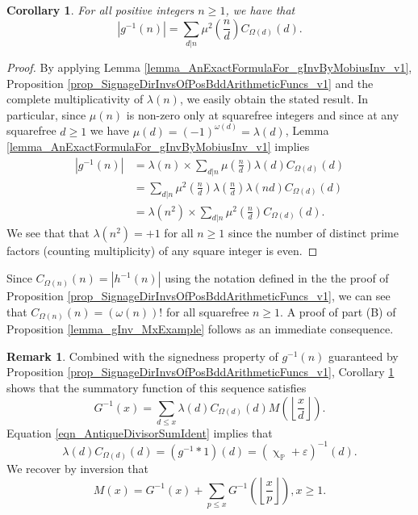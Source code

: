 \documentclass[11pt,reqno,a4letter]{article}
\numberwithin{figure}{section}
\numberwithin{table}{section}
\newcommand{\cf}{\textit{cf.\ }}
\renewcommand{\chi}{\upchi}
\newcommand{\Floor}[2]{\ensuremath{\left\lfloor \frac{#1}{#2} \right\rfloor}}
\theoremstyle{plain}
\newtheorem{cor}[theorem]{Corollary}
\numberwithin{theorem}{section}
\theoremstyle{definition}
\newtheorem{remark}[theorem]{Remark}
\begin{document}
\begin{cor} 
\label{lemma_AbsValueOf_gInvn_FornSquareFree_v1} 
For all positive integers $n \geq 1$, we have that 
\begin{equation} 
\label{eqn_AbsValueOf_gInvn_FornSquareFree_v1} 
|g^{-1}(n)| = \sum_{d|n} \mu^2\left(\frac{n}{d}\right) C_{\Omega(d)}(d). 
\end{equation} 
\end{cor} 
\begin{proof} 
By applying 
Lemma \ref{lemma_AnExactFormulaFor_gInvByMobiusInv_v1}, 
Proposition \ref{prop_SignageDirInvsOfPosBddArithmeticFuncs_v1} and the 
complete multiplicativity of $\lambda(n)$, 
we easily obtain the stated result. 
In particular, since $\mu(n)$ is non-zero only at squarefree integers and since 
at any squarefree $d \geq 1$ we have $\mu(d) = (-1)^{\omega(d)} = \lambda(d)$, 
Lemma \ref{lemma_AnExactFormulaFor_gInvByMobiusInv_v1} implies 
\begin{align*} 
|g^{-1}(n)| & = \lambda(n) \times \sum_{d|n} \mu\left(\frac{n}{d}\right) \lambda(d) C_{\Omega(d)}(d) \\ 
     & = \sum_{d|n} \mu^2\left(\frac{n}{d}\right) \lambda\left(\frac{n}{d}\right) 
     \lambda(nd) C_{\Omega(d)}(d) \\ 
     & = \lambda(n^2) \times \sum_{d|n} \mu^2\left(\frac{n}{d}\right) C_{\Omega(d)}(d). 
\end{align*} 
We see that 
that $\lambda(n^2) = +1$ for all $n \geq 1$ since the number of distinct 
prime factors (counting multiplicity) of any square integer is even. 
\end{proof} 

Since $C_{\Omega(n)}(n) = |h^{-1}(n)|$ using the notation defined in the the proof of 
Proposition \ref{prop_SignageDirInvsOfPosBddArithmeticFuncs_v1}, we can see that 
$C_{\Omega(n)}(n) = (\omega(n))!$ for all squarefree $n \geq 1$. 
A proof of part (B) of Proposition \ref{lemma_gInv_MxExample} 
follows as an immediate consequence. 

\begin{remark} 
Combined with the signedness property of $g^{-1}(n)$ guaranteed by 
Proposition \ref{prop_SignageDirInvsOfPosBddArithmeticFuncs_v1}, 
Corollary \ref{lemma_AbsValueOf_gInvn_FornSquareFree_v1} shows that the summatory 
function of this sequence satisfies 
\[
G^{-1}(x) = \sum_{d \leq x} \lambda(d) C_{\Omega(d)}(d) M\left(\Floor{x}{d}\right). 
\]
Equation \eqref{eqn_AntiqueDivisorSumIdent} implies that 
$$\lambda(d) C_{\Omega(d)}(d) = (g^{-1} \ast 1)(d) = (\chi_{\mathbb{P}} + \varepsilon)^{-1}(d).$$ 
We recover by inversion that 
\begin{equation}
\label{eqn_RmkInitialConnectionOfMxToGInvx_ProvedByInversion_v1} 
M(x) = G^{-1}(x) + \sum_{p \leq x} G^{-1}\left(\Floor{x}{p}\right), x \geq 1. 
\end{equation}
\end{remark} 
\end{document}
